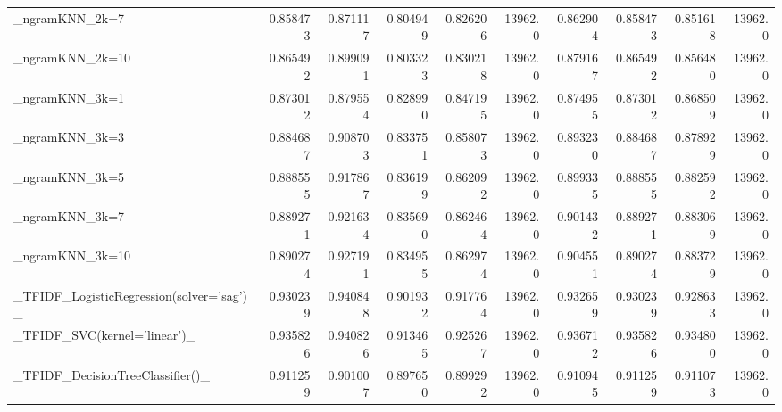 \begin{tabular}{lrrrrrrrrr}
\_ngramKNN\_2k=7                                     &  0.858473 &         0.871117 &      0.804949 &        0.826206 &        13962.0 &            0.862904 &         0.858473 &           0.851618 &           13962.0 \\
\_ngramKNN\_2k=10                                    &  0.865492 &         0.899091 &      0.803323 &        0.830218 &        13962.0 &            0.879167 &         0.865492 &           0.856480 &           13962.0 \\
\_ngramKNN\_3k=1                                     &  0.873012 &         0.879554 &      0.828990 &        0.847195 &        13962.0 &            0.874955 &         0.873012 &           0.868509 &           13962.0 \\
\_ngramKNN\_3k=3                                     &  0.884687 &         0.908703 &      0.833751 &        0.858073 &        13962.0 &            0.893230 &         0.884687 &           0.878929 &           13962.0 \\
\_ngramKNN\_3k=5                                     &  0.888555 &         0.917867 &      0.836199 &        0.862092 &        13962.0 &            0.899335 &         0.888555 &           0.882592 &           13962.0 \\
\_ngramKNN\_3k=7                                     &  0.889271 &         0.921634 &      0.835690 &        0.862464 &        13962.0 &            0.901432 &         0.889271 &           0.883069 &           13962.0 \\
\_ngramKNN\_3k=10                                    &  0.890274 &         0.927191 &      0.834955 &        0.862974 &        13962.0 &            0.904551 &         0.890274 &           0.883729 &           13962.0 \\
\_TFIDF\_LogisticRegression(solver='sag')\_           &  0.930239 &         0.940848 &      0.901932 &        0.917764 &        13962.0 &            0.932659 &         0.930239 &           0.928633 &           13962.0 \\
\_TFIDF\_SVC(kernel='linear')\_                       &  0.935826 &         0.940826 &      0.913465 &        0.925267 &        13962.0 &            0.936712 &         0.935826 &           0.934800 &           13962.0 \\
\_TFIDF\_DecisionTreeClassifier()\_                   &  0.911259 &         0.901007 &      0.897650 &        0.899292 &        13962.0 &            0.910945 &         0.911259 &           0.911073 &           13962.0 \\

\end{tabular}
